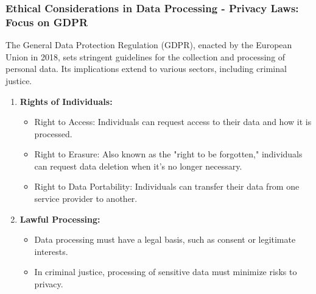 \documentclass[aspectratio=169]{beamer}
\begin{document}
\begin{frame}[fragile]
    \frametitle{Ethical Considerations in Data Processing - Privacy Laws: Focus on GDPR}
    The General Data Protection Regulation (GDPR), enacted by the European Union in 2018, sets stringent guidelines for the collection and processing of personal data. Its implications extend to various sectors, including criminal justice.

    \begin{enumerate}
        \item \textbf{Rights of Individuals:}
            \begin{itemize}
                \item Right to Access: Individuals can request access to their data and how it is processed.
                \item Right to Erasure: Also known as the "right to be forgotten," individuals can request data deletion when it's no longer necessary.
                \item Right to Data Portability: Individuals can transfer their data from one service provider to another.
            \end{itemize}
        \item \textbf{Lawful Processing:}
            \begin{itemize}
                \item Data processing must have a legal basis, such as consent or legitimate interests.
                \item In criminal justice, processing of sensitive data must minimize risks to privacy.
            \end{itemize}
    \end{enumerate}
\end{frame}
\end{document}
